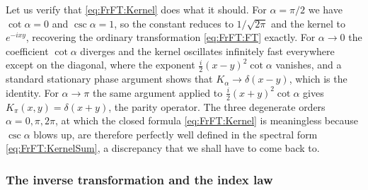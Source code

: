 			Let us verify that \eqref{eq:FrFT:Kernel} does what it should. For $\alpha = \pi/2$ we have $\cot\alpha = 0$ and $\csc\alpha = 1$, so the constant reduces to $1/\sqrt{2\pi}$ and the kernel to $e^{-ixy}$, recovering the ordinary transformation \eqref{eq:FrFT:FT} exactly. For $\alpha\to 0$ the coefficient $\cot\alpha$ diverges and the kernel oscillates infinitely fast everywhere except on the diagonal, where the exponent $\frac{i}{2}(x-y)^{2}\cot\alpha$ vanishes, and a standard stationary phase argument shows that $K_{\alpha}\to\delta(x-y)$, which is the identity. For $\alpha\to\pi$ the same argument applied to $\frac{i}{2}(x+y)^{2}\cot\alpha$ gives $K_{\pi}(x,y) = \delta(x+y)$, the parity operator. The three degenerate orders $\alpha = 0,\pi,2\pi$, at which the closed formula \eqref{eq:FrFT:Kernel} is meaningless because $\csc\alpha$ blows up, are therefore perfectly well defined in the spectral form \eqref{eq:FrFT:KernelSum}, a discrepancy that we shall have to come back to.

		\subsubsection{The inverse transformation and the index law}

